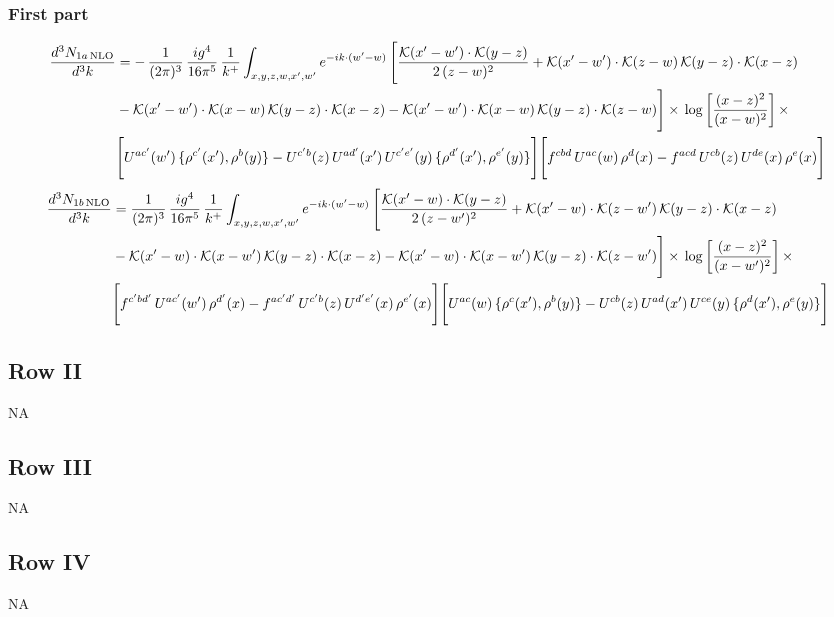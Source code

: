 \documentclass[9pt]{article}
\numberwithin{equation}{section}
\begin{document}
\subsubsection{First part}
\begin{align}
\frac{d^{3}N_{1a\,\rm NLO}}{d^{3}k} & = -\,\frac{1}{(2\pi)^{3}}\,\frac{ig^{4}}{16\pi^{5}}\,\frac{1}{k^{+}}\int_{x,y,z,w,x',w'} e^{-ik\cdot(w'-w)}\,\Bigg[\frac{\mathcal{K}(x'-w')\cdot\mathcal{K}(y-z)}{2\,(z-w)^{2}}+\mathcal{K}(x'-w')\cdot\mathcal{K}(z-w)\,\mathcal{K}(y-z)\cdot\mathcal{K}(x-z)\notag \\ & -\mathcal{K}(x'-w')\cdot\mathcal{K}(x-w)\,\mathcal{K}(y-z)\cdot\mathcal{K}(x-z)-\mathcal{K}(x'-w')\cdot\mathcal{K}(x-w)\,\mathcal{K}(y-z)\cdot\mathcal{K}(z-w)\Bigg]\times\,\log\left[\frac{(x-z)^{2}}{(x-w)^{2}}\right]\times\,\notag \\
&\Bigg[U^{ac'}(w')\,\{\rho^{c'}(x'),\rho^{b}(y)\}-U^{c'b}(z)\,U^{ad'}(x')\,U^{c'e'}(y)\,\{\rho^{d'}(x'),\rho^{e'}(y)\}\Bigg]\Bigg[f^{cbd}\,U^{ac}(w)\,\rho^{d}(x)-f^{acd}\,U^{cb}(z)\,U^{de}(x)\,\rho^{e}(x)\Bigg]
\end{align}
\begin{align}
\frac{d^{3}N_{1b\,\rm NLO}}{d^{3}k} & = \frac{1}{(2\pi)^{3}}\,\frac{ig^{4}}{16\pi^{5}}\,\frac{1}{k^{+}}\int_{x,y,z,w,x',w'} e^{-ik\cdot(w'-w)}\,\Bigg[\frac{\mathcal{K}(x'-w)\cdot\mathcal{K}(y-z)}{2\,(z-w')^{2}}+\mathcal{K}(x'-w)\cdot\mathcal{K}(z-w')\,\mathcal{K}(y-z)\cdot\mathcal{K}(x-z)\notag \\ & -\mathcal{K}(x'-w)\cdot\mathcal{K}(x-w')\,\mathcal{K}(y-z)\cdot\mathcal{K}(x-z)-\mathcal{K}(x'-w)\cdot\mathcal{K}(x-w')\,\mathcal{K}(y-z)\cdot\mathcal{K}(z-w')\Bigg]\times\,\log\left[\frac{(x-z)^{2}}{(x-w')^{2}}\right]\times\,\notag \\
&\Bigg[f^{c'bd'}\,U^{ac'}(w')\,\rho^{d'}(x)-f^{ac'd'}\,U^{c'b}(z)\,U^{d'e'}(x)\,\rho^{e'}(x)\Bigg]\Bigg[U^{ac}(w)\,\{\rho^{c}(x'),\rho^{b}(y)\}-U^{cb}(z)\,U^{ad}(x')\,U^{ce}(y)\,\{\rho^{d}(x'),\rho^{e}(y)\}\Bigg]
\end{align}
\subsection{Row II}
\textsc{NA}
\subsection{Row III}
\textsc{NA}
\subsection{Row IV}
\textsc{NA}
\end{document}
